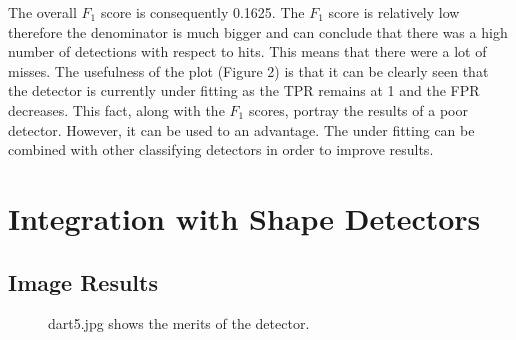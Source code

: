 \documentclass[a4paper]{article}
\begin{document}
The overall \(F_{1}\) score is consequently 0.1625. The \(F_{1}\) score is relatively low therefore the denominator is much bigger
and can conclude that there was a high number of detections with respect to hits. This means that there were a lot of misses. The usefulness of the plot (Figure 2) is that it can be clearly seen that the detector is currently under fitting as the TPR remains at 1 and the FPR decreases. This fact, along with the \(F_{1}\) scores, portray the results of a poor detector. However, it can be used to an advantage. The under fitting can be combined with other classifying detectors in order to improve results.

\section*{Integration with Shape Detectors}
\subsection*{Image Results}
\vspace{-0.7em}

\begin{figure}[H]
  \centering
  \hfill
   \hfill
   \hfill
   \caption{dart5.jpg shows the merits of the detector.}
\end{figure}
\end{document}
